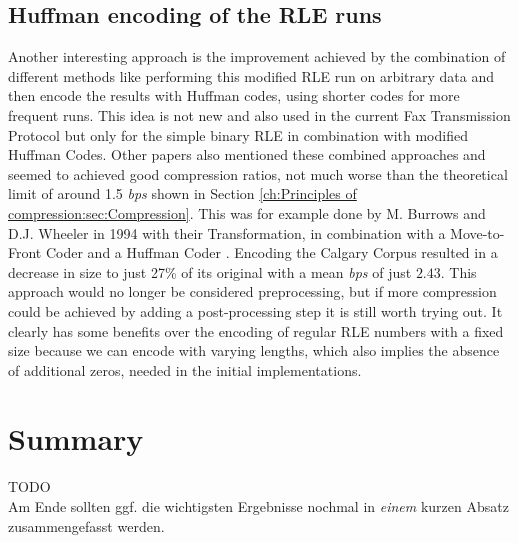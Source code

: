 \subsection{Huffman encoding of the RLE runs}
\par{
Another interesting approach is the improvement achieved by the combination of different methods like performing this modified RLE run on arbitrary data and then encode the results with Huffman codes, using shorter codes for more frequent runs. This idea is not new and also used in the current Fax Transmission Protocol but only for the simple binary RLE in combination with modified Huffman Codes. Other papers also mentioned these combined approaches and seemed to achieved good compression ratios, not much worse than the theoretical limit of around 1.5 \textit{bps} shown in Section \ref{ch:Principles of compression:sec:Compression}. This was for example done by M. Burrows and D.J. Wheeler in 1994 with their Transformation, in combination with a Move-to-Front Coder and a Huffman Coder \cite{Burrows94}. Encoding the Calgary Corpus resulted in a decrease in size to just 27\% of its original with a mean \textit{bps} of just $2.43$. This approach would no longer be considered preprocessing, but if more compression could be achieved by adding a post-processing step it is still worth trying out. It clearly has some benefits over the encoding of regular RLE numbers with a fixed size because we can encode with varying lengths, which also implies the absence of additional zeros, needed in the initial implementations.}

\section{Summary}
\label{ch:Analyse:sec:Summary}

TODO\\

Am Ende sollten ggf. die wichtigsten Ergebnisse nochmal in \emph{einem}
kurzen Absatz zusammengefasst werden.

